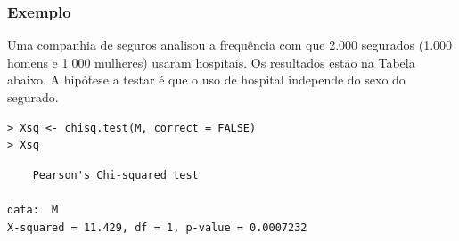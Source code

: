 \documentclass[14pt,aspectratio=1610]{beamer}
\begin{document}
\begin{frame}[fragile]{}
\frametitle{Exemplo}
\small
\begin{block}{}
\justifying
Uma companhia de seguros analisou a frequência com que 2.000 segurados (1.000 homens e 1.000 mulheres) usaram hospitais. Os resultados estão na Tabela abaixo. A hipótese a testar é que o uso de hospital independe do sexo do segurado.
\begin{verbatim}
> Xsq <- chisq.test(M, correct = FALSE)
> Xsq    
\end{verbatim}

\begin{verbatim}
	Pearson's Chi-squared test

data:  M
X-squared = 11.429, df = 1, p-value = 0.0007232    
\end{verbatim}

\end{block}
\end{frame}
\end{document}
